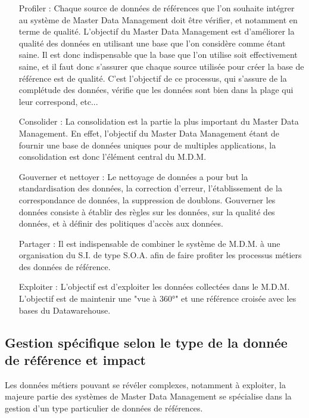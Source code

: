 \begin{itemize}

\item[Profiler : ]
Chaque source de données de références que l'on souhaite intégrer au système de Master Data Management doit être vérifier, et notamment en terme de qualité. L'objectif du Master Data Management est d'améliorer la qualité des données en utilisant une base que l'on considère comme étant saine. Il est donc indispensable que la base que l'on utilise soit effectivement saine, et il faut donc s'assurer que chaque source utilisée pour créer la base de référence est de qualité. C'est l'objectif de ce processus, qui s'assure de la complétude des données, vérifie que les données sont bien dans la plage qui leur correspond, etc...

\item[Consolider : ]
La consolidation est la partie la plus important du Master Data Management. En effet, l'objectif du Master Data Management étant de fournir une base de données uniques pour de multiples applications, la consolidation est donc l'élément central du M.D.M.

\item[Gouverner et nettoyer : ]
Le nettoyage de données a pour but la standardisation des données, la correction d'erreur, l'établissement de la correspondance de données, la suppression de doublons. Gouverner les données consiste à établir des règles sur les données, sur la qualité des données, et à définir des politiques d'accès aux données.

\item[Partager : ]
Il est indispensable de combiner le système de M.D.M. à une organisation du S.I. de type S.O.A. afin de faire profiter les processus métiers des données de référence.

\item[Exploiter : ]
L'objectif est d'exploiter les données collectées dans le M.D.M. L'objectif est de maintenir une "vue à 360°" et une référence croisée avec les bases du Datawarehouse.


\end{itemize}

\subsection{Gestion spécifique selon le type de la donnée de référence et impact}

Les données métiers pouvant se révéler complexes, notamment à exploiter, la majeure partie des systèmes de Master Data Management se spécialise dans la gestion d'un type particulier de données de références.

